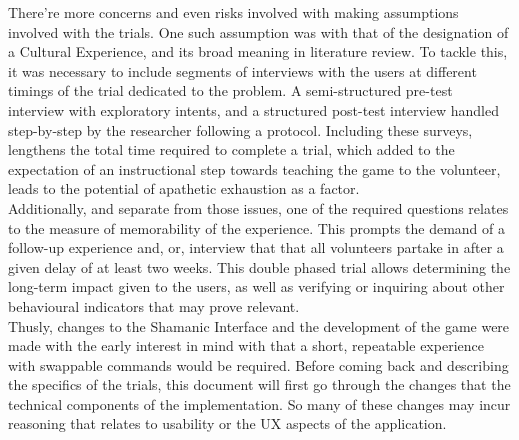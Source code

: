     There’re more concerns and even risks involved with making assumptions involved with the trials. One such assumption was with that of the designation of a Cultural Experience, and its broad meaning in literature review. To tackle this, it was necessary to include segments of interviews with the users at different timings of the trial dedicated to the problem. A semi-structured pre-test interview with exploratory intents, and a structured post-test interview handled step-by-step by the researcher following a protocol. Including these surveys, lengthens the total time required to complete a trial, which added to the expectation of an instructional step towards teaching the game to the volunteer, leads to the potential of apathetic exhaustion as a factor. \\
    Additionally, and separate from those issues, one of the required questions relates to the measure of memorability of the experience. This prompts the demand of a follow-up experience and, or, interview that that all volunteers partake in after a given delay of at least two weeks. This double phased trial allows determining the long-term impact given to the users, as well as verifying or inquiring about other behavioural indicators that may prove relevant.\\
    Thusly, changes to the Shamanic Interface and the development of the game were made with the early interest in mind with that a short, repeatable experience with swappable commands would be required. Before coming back and describing the specifics of the trials, this document will first go through the changes that the technical components of the implementation. So many of these changes may incur reasoning that relates to usability or the UX aspects of the application.
